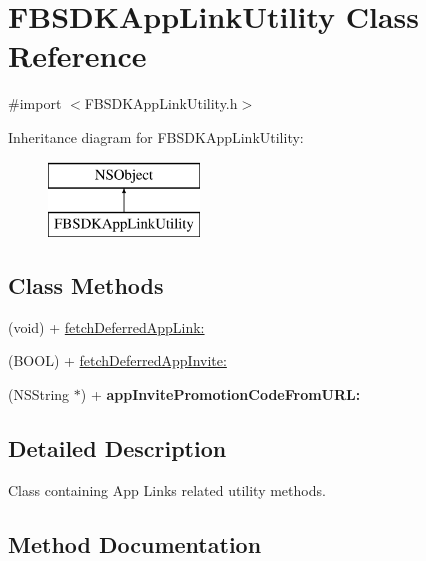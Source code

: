 \hypertarget{interface_f_b_s_d_k_app_link_utility}{}\section{F\+B\+S\+D\+K\+App\+Link\+Utility Class Reference}
\label{interface_f_b_s_d_k_app_link_utility}


{\ttfamily \#import $<$F\+B\+S\+D\+K\+App\+Link\+Utility.\+h$>$}

Inheritance diagram for F\+B\+S\+D\+K\+App\+Link\+Utility\+:\begin{figure}[H]
\begin{center}
\leavevmode
\includegraphics[height=2.000000cm]{interface_f_b_s_d_k_app_link_utility}
\end{center}
\end{figure}
\subsection*{Class Methods}
\begin{DoxyCompactItemize}
\item 
(void) + \hyperlink{interface_f_b_s_d_k_app_link_utility_a0b3a90ed3cc6c53d53fe3affa5b7be87}{fetch\+Deferred\+App\+Link\+:}
\item 
(B\+O\+O\+L) + \hyperlink{interface_f_b_s_d_k_app_link_utility_a996b81c149096186d3dd1ec1ef62a591}{fetch\+Deferred\+App\+Invite\+:}
\item 
\hypertarget{interface_f_b_s_d_k_app_link_utility_a4e891136b5679a9e7db95c70803ba376}{}(N\+S\+String $\ast$) + {\bfseries app\+Invite\+Promotion\+Code\+From\+U\+R\+L\+:}\label{interface_f_b_s_d_k_app_link_utility_a4e891136b5679a9e7db95c70803ba376}

\end{DoxyCompactItemize}


\subsection{Detailed Description}
Class containing App Links related utility methods. 

\subsection{Method Documentation}
\hypertarget{interface_f_b_s_d_k_app_link_utility_a996b81c149096186d3dd1ec1ef62a591}{}
